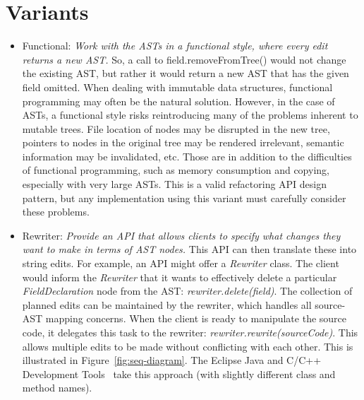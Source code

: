 \documentclass[prodmode]{acmlarge}
\begin{document}
\section{Variants}

\begin{itemize}

    \item Functional: \textit{Work with the ASTs in a functional style, where every edit
        returns a new AST.} So, a call to field.removeFromTree() would not
        change the existing AST, but rather it would return a new AST that has
        the given field omitted. When dealing with immutable data structures,
        functional programming may often be the natural solution. However,
        in the case of ASTs, a functional style risks reintroducing many of 
        the problems inherent to mutable trees. File location of nodes may
        be disrupted in the new tree, pointers to nodes in the original tree may
        be rendered 
        irrelevant, semantic information may be invalidated, etc. Those are in
        addition to the difficulties of functional programming, such as memory
        consumption and copying, especially with very large ASTs. This is
        a valid refactoring API design pattern, but any implementation using 
        this variant must carefully consider these problems.

    \item Rewriter: \textit{Provide an API that allows clients to specify what changes
        they want to make in terms of AST nodes.}  This API can then translate these into string edits.  For example, an API might offer a \textit{Rewriter} 
class. The client would inform the \textit{Rewriter} that it wants to 
effectively delete a particular \textit{FieldDeclaration} node from the AST:
\textit{rewriter.delete(field)}.  The collection of planned edits can be 
        maintained by the rewriter, which handles all source-AST mapping concerns. When the client is ready to manipulate the source
code, it delegates this task to the rewriter:
\textit{rewriter.rewrite(sourceCode)}.  This allows multiple edits to be made 
without conflicting with each other. This is illustrated in
Figure~\ref{fig:seq-diagram}.  The Eclipse Java and C/C++ Development
Tools~\cite{cdt-refactoring} take this approach (with slightly different class
and method names).


\end{itemize}
\end{document}

